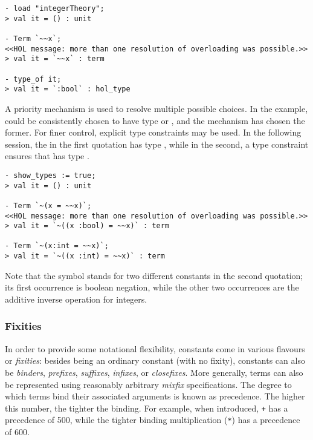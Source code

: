 \setcounter{sessioncount}{0}
\begin{session}
\begin{verbatim}
- load "integerTheory";
> val it = () : unit

- Term `~~x`;
<<HOL message: more than one resolution of overloading was possible.>>
> val it = `~~x` : term

- type_of it;
> val it = `:bool` : hol_type
\end{verbatim}
\end{session}

A priority mechanism is used to resolve multiple possible choices. In
the example, \holtxt{\~{}} could be consistently chosen to have type
 or , and the
mechanism has chosen the former. For finer control, explicit type
constraints may be used. In the following session, the
 in the first quotation has type ,
while in the second, a type constraint ensures that  has
type .

\begin{session}
\begin{verbatim}
- show_types := true;
> val it = () : unit

- Term `~(x = ~~x)`;
<<HOL message: more than one resolution of overloading was possible.>>
> val it = `~((x :bool) = ~~x)` : term

- Term `~(x:int = ~~x)`;
> val it = `~((x :int) = ~~x)` : term
\end{verbatim}
\end{session}

Note that the symbol \holtxt{\~{}} stands for two different constants in
the second quotation; its first occurrence is boolean negation, while
the other two occurrences are the additive inverse operation for
integers.

\subsubsection{Fixities}
\label{sec:parseprint:fixities}

In order to provide some notational flexibility, constants come in various flavours or {\it fixities}: besides being an ordinary constant (with no fixity), constants can also be {\it binders}, {\it prefixes}, {\it suffixes}, {\it infixes}, or {\it closefixes}.
More generally, terms can also be represented using reasonably arbitrary {\it mixfix} specifications.
The degree to which terms bind their associated arguments is known as precedence.
The higher this number, the tighter the binding.
For example, when introduced, \verb-+- has a precedence of 500, while the tighter binding multiplication (\verb+*+) has a precedence of 600.

